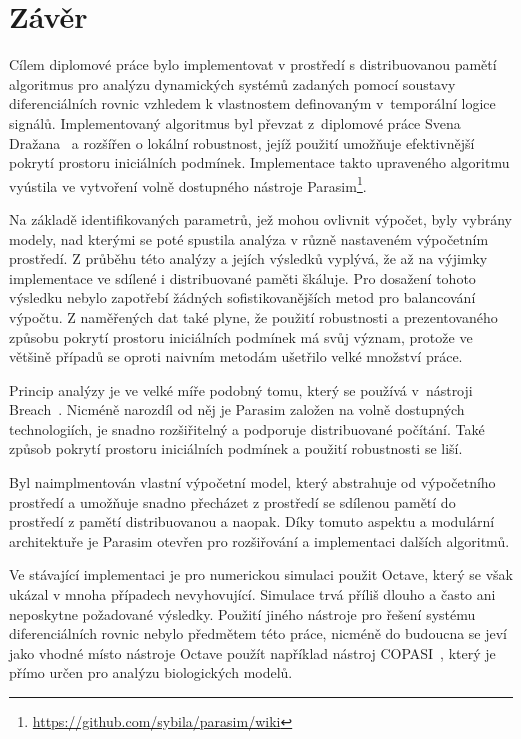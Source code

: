 \chapter{Závěr}\label{chapter:conclusion}

Cílem diplomové práce bylo implementovat v prostředí s distribuovanou pamětí
algoritmus pro analýzu dynamických systémů zadaných pomocí
soustavy diferenciálních rovnic vzhledem k vlastnostem definovaným
v~tem\-po\-rál\-ní logice signálů. Implementovaný algoritmus byl
převzat z~diplomové práce Svena Dražana~\cite{drazan2011} a rozšířen o lokální robustnost, jejíž použití umožňuje
efektivnější pokrytí prostoru iniciálních pod\-mí\-nek. 
Implementace takto upraveného algoritmu vyústila ve vytvoření volně dostupného nástroje Parasim\footnote{\url{https://github.com/sybila/parasim/wiki}}.

Na základě identifikovaných parametrů, jež mohou ovlivnit výpočet, byly vybrány modely,
nad kterými se poté spustila analýza v různě nastaveném výpočetním prostředí.
Z průběhu této analýzy a jejích výsledků vyplývá, že až na výjimky implementace
ve sdílené i distribuované paměti škáluje. Pro dosažení tohoto výsledku nebylo zapotřebí
žádných sofistikovanějších metod pro balancování výpočtu. Z naměřených
dat také plyne, že použití robustnosti a prezentovaného způsobu pokrytí prostoru iniciálních podmínek má svůj význam,
protože ve většině případů se oproti naivním metodám ušetřilo velké množství práce.

Princip analýzy je ve velké míře podobný tomu, který se používá v~nás\-tro\-ji Breach~\cite{donze2010breach}.
Nicméně narozdíl od něj je Parasim založen na volně dostupných technologiích, je snadno rozšiřitelný
a podporuje distribuované počítání. Také způsob pokrytí prostoru iniciálních podmínek
a použití robustnosti se liší.

Byl naimplmentován vlastní výpočetní model, který abstrahuje od vý\-po\-čet\-ního
prostředí a umožňuje snadno přecházet z prostředí se sdí\-le\-nou pamětí do prostředí z pamětí distribuovanou
a naopak. Díky tomuto a\-spek\-tu a modulární architektuře je Parasim otevřen pro rozšiřování a
implementaci dalších algoritmů.

Ve stávající implementaci je pro numerickou simulaci použit Octave, který se
však ukázal v mnoha případech nevyhovující. Simulace trvá příliš dlouho a často ani
neposkytne požadované výsledky. Použití jiného nástroje pro řešení systému
diferenciálních rovnic nebylo předmětem této práce, nicméně do budoucna se jeví jako vhodné
místo nástroje Octave použít například nástroj COPASI~\cite{hoops2006}, který je přímo určen
pro analýzu biologických modelů.
